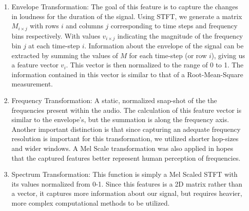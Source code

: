 \documentclass{nime-alternate} %
\begin{document}
\begin{enumerate}
\item Envelope Transformation: The goal of this feature is to capture the changes in loudness for the duration of the signal. Using STFT, we generate a matrix $M_{i \times j}$ with rows $i$ and columns $j$ corresponding to time steps and frequency bins respectively. With values $v_{i \times j}$ indicating the magnitude of the frequency bin $j$ at each time-step $i$. Information about the envelope of the signal can be extracted by summing the values of $M$ for each time-step (or row $i$), giving us a feature vector $v_i$. This vector is then normalized to the range of 0 to 1. The information contained in this vector is similar to that of a Root-Mean-Square measurement.
\item Frequency Transformation: A static, normalized snap-shot of the the frequencies present within the audio. The calculation of this feature vector is similar to the envelope's, but the summation is along the frequency axis. Another important distinction is that since capturing an adequate frequency resolution is important for this transformation, we utilized shorter hop-sizes and wider windows. A Mel Scale transformation was also applied in hopes that the captured features better represent human perception of frequencies. 
\item Spectrum Transformation: This function is simply a Mel Scaled STFT with its values normalized from 0-1. Since this features is a 2D matrix rather than a vector, it captures more information about our signal, but requires heavier, more complex computational methods to be utilized. 
\end{enumerate}   
\end{document}
